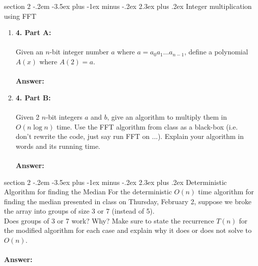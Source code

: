 \documentclass{article}
\makeatletter
\newenvironment{problem}{\@startsection
       {section}
       {2}
       {-.2em}
       {-3.5ex plus -1ex minus -.2ex}
       {2.3ex plus .2ex}
       {\pagebreak[3]%
       \large\bf\noindent{Problem }
       }
       }
\makeatother
\begin{document}
\newpage
\begin{problem} {Integer multiplication using FFT}
	\begin{enumerate}
		\item [] \textbf{4. Part A:}\\\\
		Given an $n$-bit integer number $a$ where $a = a_0a_1\dots a_{n-1}$, define a polynomial $A(x)$ where $A(2) = a$.\\\\
		\textbf{Answer:}
		
		
		\newpage
		\item[] \textbf{4. Part B:}\\\\
		Given 2 $n$-bit integers $a$ and $b$, give an algorithm to multiply them in $O(n\log{n})$ time.  Use the FFT algorithm from class as a black-box (i.e. don't rewrite the code, just say run FFT on ...).  Explain your algorithm in words and its running time.\\\\
		\textbf{Answer:}
	\end{enumerate}
	
\end{problem}

\newpage
\begin{problem} {Deterministic Algorithm for finding the Median}
	For the deterministic $O(n)$ time algorithm for finding the median presented in class on Thursday, February 2, suppose we broke the array into groups of size 3 or 7 (instead of 5).\\
	Does groups of 3 or 7 work?  Why? Make sure to state the recurrence $T(n)$ for the modified algorithm for each case and explain why it does or does not solve to $O(n)$.\\\\
	\textbf{Answer:}
	
\end{problem}
\end{document}
